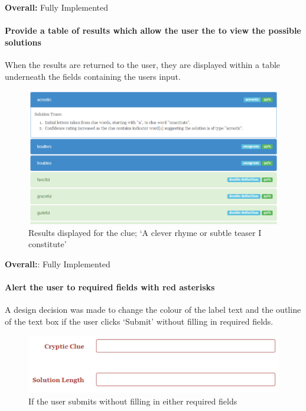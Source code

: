 {\bf Overall:} Fully Implemented


\paragraph{Provide a table of results which allow the user the to view the
possible solutions}

When the results are returned to the user, they are displayed within a table
underneath the fields containing the users input.

\begin{figure}[H]
	\centering
	\includegraphics[keepaspectratio=true,scale=0.6]{evidence/listsolutions.png}
	\caption{Results displayed for the clue; `A clever rhyme or subtle teaser I constitute'}
\end{figure}

{\bf Overall:}: Fully Implemented


\paragraph{Alert the user to required fields with red asterisks}    

A design decision was made to change the colour of the label text  and the
outline of the text box if the user clicks `Submit' without filling in  required
fields.

\begin{figure}[H]
	\centering
	\includegraphics[keepaspectratio=true]{evidence/alert1.png}
	\caption{If the user submits without filling in either required fields}
\end{figure}

